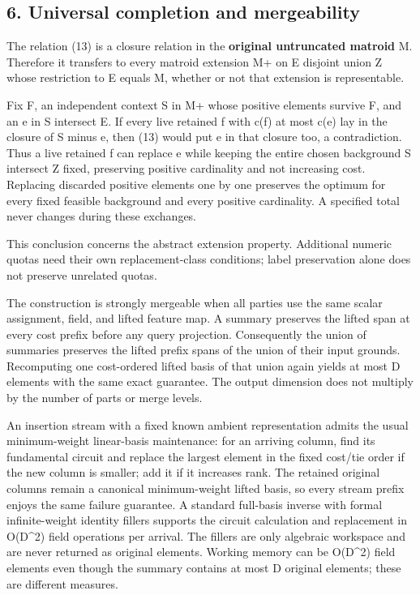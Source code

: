 \hypertarget{af-7a1626f5ae-universal-completion-and-mergeability}{%
\subsection{6. Universal completion and mergeability}\label{af-7a1626f5ae-universal-completion-and-mergeability}}

The relation (13) is a closure relation in the \textbf{original untruncated matroid} M. Therefore it transfers to every matroid extension M+ on E disjoint union Z whose restriction to E equals M, whether or not that extension is representable.

Fix F, an independent context S in M+ whose positive elements survive F, and an e in S intersect E. If every live retained f with c(f) at most c(e) lay in the closure of S minus e, then (13) would put e in that closure too, a contradiction. Thus a live retained f can replace e while keeping the entire chosen background S intersect Z fixed, preserving positive cardinality and not increasing cost. Replacing discarded positive elements one by one preserves the optimum for every fixed feasible background and every positive cardinality. A specified total never changes during these exchanges.

This conclusion concerns the abstract extension property. Additional numeric quotas need their own replacement-class conditions; label preservation alone does not preserve unrelated quotas.

The construction is strongly mergeable when all parties use the same scalar assignment, field, and lifted feature map. A summary preserves the lifted span at every cost prefix before any query projection. Consequently the union of summaries preserves the lifted prefix spans of the union of their input grounds. Recomputing one cost-ordered lifted basis of that union again yields at most D elements with the same exact guarantee. The output dimension does not multiply by the number of parts or merge levels.

An insertion stream with a fixed known ambient representation admits the usual minimum-weight linear-basis maintenance: for an arriving column, find its fundamental circuit and replace the largest element in the fixed cost/tie order if the new column is smaller; add it if it increases rank. The retained original columns remain a canonical minimum-weight lifted basis, so every stream prefix enjoys the same failure guarantee. A standard full-basis inverse with formal infinite-weight identity fillers supports the circuit calculation and replacement in O(D\^{}2) field operations per arrival. The fillers are only algebraic workspace and are never returned as original elements. Working memory can be O(D\^{}2) field elements even though the summary contains at most D original elements; these are different measures.

